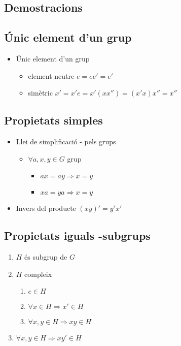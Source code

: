 \documentclass{article}
\begin{document}
\subsection{Demostracions}
\subsection{Únic element d'un grup}
\begin{itemize}
\item Únic element d'un grup
	\begin{itemize}
	\item element neutre $e = ee' = e'$
	\item simètric $x' = x'e = x'(xx'') = (x'x)x'' = x''$
	\end{itemize}
\end{itemize}

\subsection{Propietats simples}
\begin{itemize}
\item Llei de simplificació - pels grups
	\begin{itemize}
	\item $\forall a, x, y \in G$ grup
		\begin{itemize}
		\item $ax = ay \Rightarrow x = y$
		\item $xa = ya \Rightarrow x = y$
		\end{itemize}
	\end{itemize}
\item Invers del producte
	\subitem $(xy)' = y'x'$
\end{itemize}
\subsection{Propietats iguals -subgrups}
\begin{enumerate}
\item $H$ és subgrup de $G$
\item $H$ compleix
	\begin{enumerate}
	\item $e \in H$
	\item $\forall x \in H \Rightarrow x' \in H$
	\item $\forall x, y \in H \Rightarrow xy \in H$
	\end{enumerate}
\item $\forall x, y \in H \Rightarrow xy' \in H$
\end{enumerate}
\end{document}
